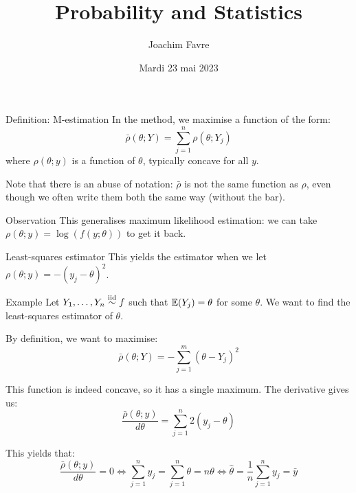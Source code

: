 \documentclass[a4paper]{article}
\title{Probability and Statistics}
\author{Joachim Favre}
\date{Mardi 23 mai 2023}
\begin{document}
\maketitle


\begin{parag}{Definition: M-estimation}
    In the  method, we maximise a function of the form: 
    \[\bar{\rho}\left(\theta ; Y\right) = \sum_{j=1}^{n} \rho\left(\theta; Y_j\right)\]
    where $\rho\left(\theta ; y\right)$ is a function of $\theta$, typically concave for all $y$.

    Note that there is an abuse of notation: $\bar{\rho}$ is not the same function as $\rho$, even though we often write them both the same way (without the bar).

    \begin{subparag}{Observation}
        This generalises maximum likelihood estimation: we can take $\rho\left(\theta; y\right) = \log\left(f\left(y; \theta\right)\right)$ to get it back.
    \end{subparag}

    \begin{subparag}{Least-squares estimator}
        This yields the  estimator when we let $\rho\left(\theta; y\right) = -\left(y_j - \theta\right)^2$.
    \end{subparag}
\end{parag}

\begin{parag}{Example}
    Let $Y_1, \ldots, Y_n \overset{\text{iid}}{\sim} f$ such that $\exval\left(Y_j\right) = \theta$ for some $\theta$. We want to find the least-squares estimator of $\theta$.

    By definition, we want to maximise: 
    \[\bar{\rho}\left(\theta;Y\right) = -\sum_{j=1}^{m} \left(\theta - Y_j\right)^2\]
    
    This function is indeed concave, so it has a single maximum. The derivative gives us: 
    \[\frac{\bar{\rho}\left(\theta; y\right)}{d\theta} = \sum_{j=1}^{n} 2\left(y_j - \theta\right)\]
    
    This yields that: 
    \[\frac{\bar{\rho}\left(\theta; y\right)}{d\theta} = 0 \iff \sum_{j=1}^{n} y_j = \sum_{j=1}^{n} \theta = n \theta \iff \hat{\theta} = \frac{1}{n}\sum_{j=1}^{n} y_j = \bar{y}\]
\end{parag}
\end{document}
